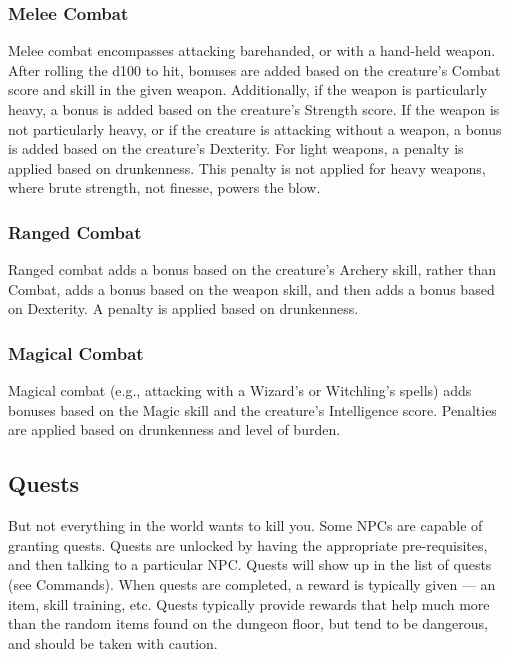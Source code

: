 \subsubsection{Melee Combat}

Melee combat encompasses attacking barehanded, or with a hand-held
weapon.  After rolling the d100 to hit, bonuses are added based on the
creature's Combat score and skill in the given weapon.  Additionally, if
the weapon is particularly heavy, a bonus is added based on the creature's
Strength score.  If the weapon is not particularly heavy, or if the
creature is attacking without a weapon, a bonus is added based on the 
creature's Dexterity.  For light weapons, a penalty is applied based on
drunkenness.  This penalty is not applied for heavy weapons, where brute
strength, not finesse, powers the blow.

\subsubsection{Ranged Combat}

Ranged combat adds a bonus based on the creature's Archery skill, rather
than Combat, adds a bonus based on the weapon skill, and then adds a 
bonus based on Dexterity.  A penalty is applied based on drunkenness.

\subsubsection{Magical Combat}

Magical combat (e.g., attacking with a Wizard's or Witchling's spells)
adds bonuses based on the Magic skill and the creature's Intelligence
score.  Penalties are applied based on drunkenness and level of burden.

\subsection{Quests}

But not everything in the world wants to kill you.  Some NPCs are capable 
of granting quests.  Quests are unlocked by having the appropriate 
pre-requisites, and then talking to a particular NPC.  Quests will show up 
in the list of quests (see Commands).  When quests are completed, a reward 
is typically given --- an item, skill training, etc.  Quests typically 
provide rewards that help much more than the random items found on the 
dungeon floor, but tend to be dangerous, and should be taken with caution.

